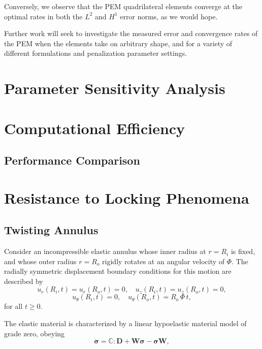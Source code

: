 Conversely, we observe that the PEM quadrilateral elements converge at the optimal rates in both the $L^2$ and $H^1$ error norms, as we would hope.

Further work will seek to investigate the measured error and convergence rates of the PEM when the elements take on arbitrary shape, and for a variety of different formulations and penalization parameter settings.

\section{Parameter Sensitivity Analysis}

\section{Computational Efficiency}
\subsection{Performance Comparison}

\section{Resistance to Locking Phenomena}

\subsection*{Twisting Annulus}

Consider an incompressible elastic annulus whose inner radius at $r = R_i$ is fixed, and whose outer radius $r = R_o$ rigidly rotates at an angular velocity of $\Phi$. The radially symmetric displacement boundary conditions for this motion are described by
\begin{equation}
	u_r (R_i,t) = u_r (R_o,t) = 0, \quad u_z (R_i,t) = u_z (R_o,t) = 0,
\end{equation}
\begin{equation}
	u_\theta (R_i,t) = 0, \quad u_\theta (R_o,t) = R_o \, \Phi \, t,
\end{equation}
for all $t \geq 0$.

The elastic material is characterized by a linear hypoelastic material model of grade zero, obeying
\begin{equation}
  \dot{\boldsymbol{\sigma}} = \mathbb{C} : \mathbf{D} + \mathbf{W} \boldsymbol{\sigma} - \boldsymbol{\sigma} \mathbf{W},
\end{equation}

